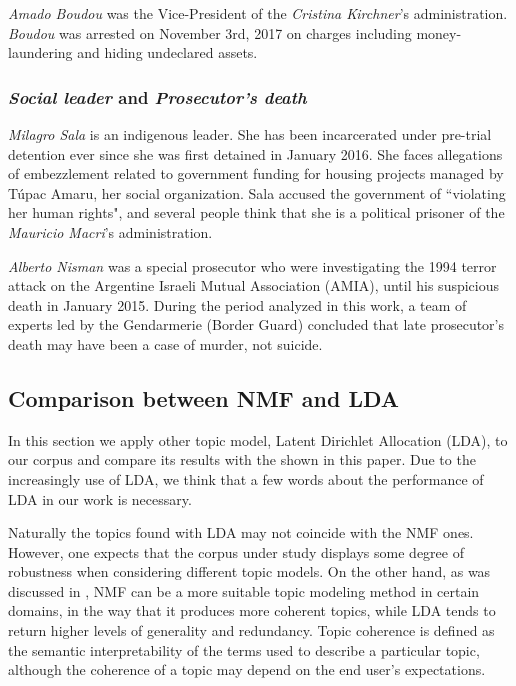 \documentclass{bmcart}
\begin{document}
\par \emph{Amado Boudou} was the Vice-President of the \emph{Cristina Kirchner}'s administration.
\emph{Boudou} was arrested on November 3rd, 2017 on charges including money-laundering and hiding undeclared assets.

\subsubsection*{\emph{Social leader} and \emph{Prosecutor's death}}

\par \emph{Milagro Sala} is an indigenous leader. 
She has been incarcerated under pre-trial detention ever since she was first detained in January 2016. She faces allegations of embezzlement related to government funding for housing projects managed by T\'upac Amaru, her social organization.
Sala accused the government of ``violating her human rights", and several people think that she is a political prisoner of the \emph{Mauricio Macri}'s administration.

\par \emph{Alberto Nisman} was a special prosecutor who were investigating the 1994 terror attack on the Argentine Israeli Mutual Association (AMIA), until his suspicious death in January 2015.
During the period analyzed in this work, a team of experts led by the Gendarmerie (Border Guard) concluded that late prosecutor's death may have been a case of murder, not suicide.


\subsection*{Comparison between NMF and LDA}

\par In this section we apply other topic model, Latent Dirichlet Allocation \cite{blei2003latent} (LDA), to our corpus and compare its results with the shown in this paper. Due to the increasingly use of LDA, we think that a few words about the performance of LDA in our work is necessary. 

\par Naturally the topics found with LDA may not coincide with the NMF ones.
However, one expects that the corpus under study displays some degree of  robustness  when considering different topic models.
On the other hand, as was discussed in \cite{o2015analysis}, NMF can be a more suitable topic modeling method in certain domains, in the way that it produces more coherent topics, while LDA tends to return higher levels of generality and redundancy. Topic coherence is defined as the semantic interpretability of the terms used to describe a particular topic, although the coherence of a topic may depend on the end user's expectations.
\end{document}
